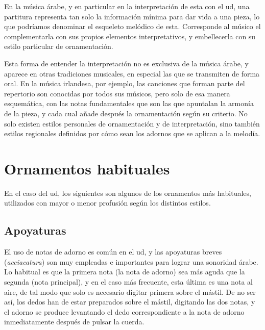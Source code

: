 En la música árabe, y en particular en la interpretación de esta con el ud, una partitura representa tan solo la información mínima para dar vida a una pieza, lo que podríamos denominar el esqueleto melódico de esta. Corresponde al músico el complementarla con sus propios elementos interpretativos, y embellecerla con su estilo particular de ornamentación.

Esta forma de entender la interpretación no es exclusiva de la música árabe, y aparece en otras tradiciones musicales, en especial las que se transmiten de forma oral. En la música irlandesa, por ejemplo, las canciones que forman parte del repertorio son conocidas por todos sus músicos, pero solo de esa manera esquemática, con las notas fundamentales que son las que apuntalan la armonía de la pieza, y cada cual añade después la ornamentación según su criterio. No solo existen estilos personales de ornamentación y de interpretación, sino también estilos regionales definidos por cómo sean los adornos que se aplican a la melodía.

\section{Ornamentos habituales}

En el caso del ud, los siguientes son algunos de los ornamentos más habituales, utilizados con mayor o menor profusión según los distintos estilos.


\subsection{Apoyaturas}

El uso de notas de adorno es común en el ud, y las apoyaturas breves (\emph{acciacatura}) son muy empleadas e importantes para lograr una sonoridad árabe. Lo habitual es que la primera nota (la nota de adorno) sea más aguda que la segunda (nota principal), y en el caso más frecuente, esta última es una nota al aire, de tal modo que solo es necesario digitar primera sobre el mástil. De no ser así, los dedos han de estar preparados sobre el mástil, digitando las dos notas, y el adorno se produce levantando el dedo correspondiente a la nota de adorno inmediatamente después de pulsar la cuerda.

\begin{center}
\end{center}

